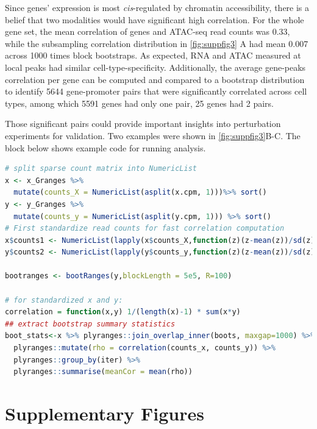 \documentclass{article}
\begin{document}
Since genes' expression is most \textit{cis}-regulated by chromatin
accessibility, there is a belief that two modalities would have
significant high correlation. For the whole gene set, the mean
correlation of genes and ATAC-seq read counts was 0.33, while the
subsampling correlation distribution in \cref{fig:suppfig3} A had mean
0.007 across 1000 times block bootstraps. As expected, RNA and ATAC
measured at local peaks had similar cell-type-specificity.
Additionally, the average gene-peaks correlation per gene can be
computed and compared to a bootstrap distribution to identify 5644
gene-promoter pairs that were significantly correlated across cell
types, among which 5591 genes had only one pair, 25 genes had 2 pairs.

Those significant pairs could provide important insights into
perturbation experiments for validation. Two examples were shown in
\cref{fig:suppfig3}B-C. The block below shows example code for running
analysis.

\begin{lstlisting}[language=R]
# split sparse count matrix into NumericList
x <- x_Granges %>%
  mutate(counts_X = NumericList(asplit(x.cpm, 1)))%>% sort()
y <- y_Granges %>%
  mutate(counts_y = NumericList(asplit(y.cpm, 1))) %>% sort()
# First standardize read counts for fast correlation computation
x$counts1 <- NumericList(lapply(x$counts_X,function(z)(z-mean(z))/sd(z)))
y$counts2 <- NumericList(lapply(y$counts_y,function(z)(z-mean(z))/sd(z)))

bootranges <- bootRanges(y,blockLength = 5e5, R=100)
  
# for standardized x and y:
correlation = function(x,y) 1/(length(x)-1) * sum(x*y)
## extract bootstrap summary statistics
boot_stats<-x %>% plyranges::join_overlap_inner(boots, maxgap=1000) %>%
  plyranges::mutate(rho = correlation(counts_x, counts_y)) %>%
  plyranges::group_by(iter) %>%
  plyranges::summarise(meanCor = mean(rho)) 
\end{lstlisting} 
 
\newpage

\section{Supplementary Figures}
\end{document}
